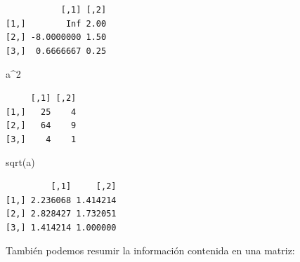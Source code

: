 \documentclass[
]{book}
\newenvironment{Shaded}{\begin{snugshade}}{\end{snugshade}}
\newcommand{\DecValTok}[1]{\textcolor[rgb]{0.00,0.00,0.81}{#1}}
\newcommand{\FunctionTok}[1]{\textcolor[rgb]{0.00,0.00,0.00}{#1}}
\newcommand{\NormalTok}[1]{#1}
\newcommand{\SpecialCharTok}[1]{\textcolor[rgb]{0.00,0.00,0.00}{#1}}
\begin{document}
\begin{verbatim}
           [,1] [,2]
[1,]        Inf 2.00
[2,] -8.0000000 1.50
[3,]  0.6666667 0.25
\end{verbatim}

\begin{Shaded}
\begin{Highlighting}[]
\NormalTok{a}\SpecialCharTok{\^{}}\DecValTok{2}
\end{Highlighting}
\end{Shaded}

\begin{verbatim}
     [,1] [,2]
[1,]   25    4
[2,]   64    9
[3,]    4    1
\end{verbatim}

\begin{Shaded}
\begin{Highlighting}[]
\FunctionTok{sqrt}\NormalTok{(a)}
\end{Highlighting}
\end{Shaded}

\begin{verbatim}
         [,1]     [,2]
[1,] 2.236068 1.414214
[2,] 2.828427 1.732051
[3,] 1.414214 1.000000
\end{verbatim}

También podemos resumir la información contenida en una matriz:
\end{document}
